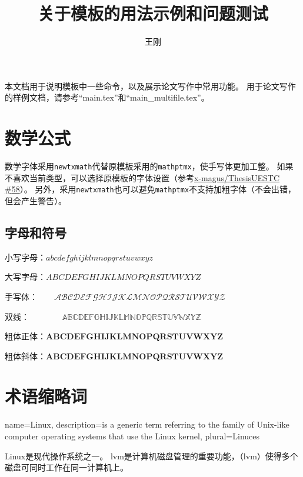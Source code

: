 \documentclass[doctor]{thesis-uestc}
\title{关于模板的用法示例和问题测试}
\author{王刚}
\begin{document}
\thesisglossarylist

\thesischapterexordium
本文档用于说明模板中一些命令，以及展示论文写作中常用功能。
用于论文写作的样例文档，请参考``main.tex''和``main\_multifile.tex''。

\chapter{数学公式}

数学字体采用\texttt{newtxmath}代替原模板采用的\texttt{mathptmx}，使手写体更加工整。
如果不喜欢当前类型，可以选择原模板的字体设置（参考\href{https://github.com/x-magus/ThesisUESTC/issues/58}{x-magus/ThesisUESTC {\#}58}）。
另外，采用\texttt{newtxmath}也可以避免\texttt{mathptmx}不支持加粗字体（不会出错，但会产生警告）。

\section{字母和符号}

小写字母：\(abcdefghijklmnopqrstuvwxyz\)

大写字母：\(ABCDEFGHIJKLMNOPQRSTUVWXYZ\)

手写体：~~~~\(\mathcal{ABCDEFGHIJKLMNOPQRSTUVWXYZ}\)

双线：~~~~~~~~\(\mathbb{ABCDEFGHIJKLMNOPQRSTUVWXYZ}\)

粗体正体：\(\mathbf{ABCDEFGHIJKLMNOPQRSTUVWXYZ}\)

粗体斜体：\(\bm{ABCDEFGHIJKLMNOPQRSTUVWXYZ}\)

\chapter{术语缩略词}

{
  name=Linux,
  description={is a generic term referring to the family of Unix-like
    computer operating systems that use the Linux kernel},
  plural=Linuces
}

\gls{Linux}是现代操作系统之一。
\gls{lvm}是计算机磁盘管理的重要功能，（\gls{lvm}）使得多个磁盘可同时工作在同一计算机上。
\end{document}
